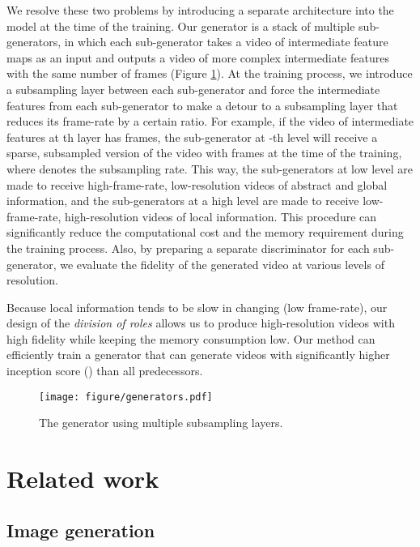 \documentclass[twocolumn]{svjour3}
\def\Fig#1{Figure \ref{fig:#1}}
\begin{document}
We resolve these two problems by introducing a separate architecture into the model at the time of the training.
Our generator is a stack of multiple sub-generators, in which each sub-generator takes a video of intermediate feature maps as an input and outputs a video of more complex intermediate features with the same number of frames (\Fig{multigen}).
At the training process, we introduce a subsampling layer between each sub-generator and force the intermediate features from each sub-generator to make a detour to a subsampling layer that reduces its frame-rate by a certain ratio.
For example, if the video of intermediate features at th layer has  frames, the sub-generator at -th level will receive a sparse, subsampled version of the video with  frames at the time of the training, where  denotes the subsampling rate.
This way, the sub-generators at low level are made to receive high-frame-rate, low-resolution videos of abstract and global information, and the sub-generators at a high level are made to receive low-frame-rate, high-resolution videos of local information.
This procedure can significantly reduce the computational cost and the memory requirement during the training process.
Also, by preparing a separate discriminator for each sub-generator, we evaluate the fidelity of the generated video at various levels of resolution.

Because local information tends to be slow in changing (low frame-rate), our design of the {\em division of roles} allows us to produce high-resolution videos with high fidelity while keeping the memory consumption low.
Our method can efficiently train a generator that can generate videos with significantly higher inception score () than all predecessors.


\begin{figure}[t]
\centering
  \texttt{[image: figure/generators.pdf]}
  \caption{The generator using multiple subsampling layers.}
  \label{fig:multigen}

\end{figure}

\section{Related work}
\label{sec:related_work}

\subsection{Image generation}
\end{document}
